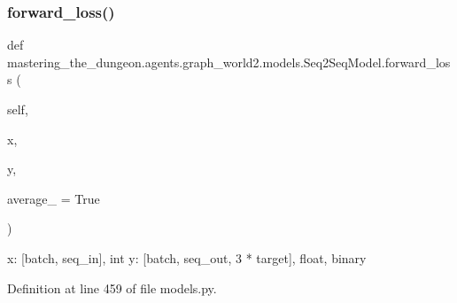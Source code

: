 \subsubsection{\texorpdfstring{forward\+\_\+loss()}{forward\_loss()}}
{\footnotesize\ttfamily def mastering\+\_\+the\+\_\+dungeon.\+agents.\+graph\+\_\+world2.\+models.\+Seq2\+Seq\+Model.\+forward\+\_\+loss (\begin{DoxyParamCaption}\item[{}]{self,  }\item[{}]{x,  }\item[{}]{y,  }\item[{}]{average\+\_\+ = {\ttfamily True} }\end{DoxyParamCaption})}

\begin{DoxyVerb}x: [batch, seq_in], int
y: [batch, seq_out, 3 * target], float, binary
\end{DoxyVerb}
 

Definition at line 459 of file models.\+py.



